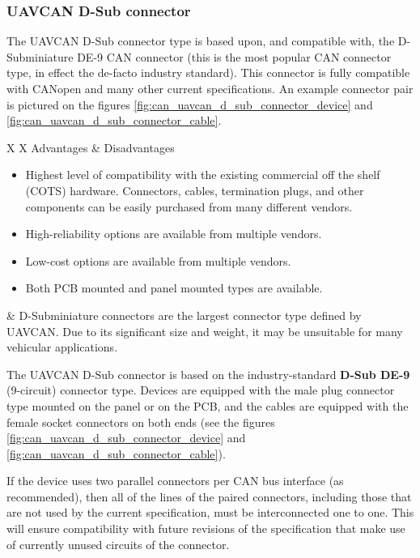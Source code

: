 \subsubsection{UAVCAN D-Sub connector}

The UAVCAN D-Sub connector type is based upon, and compatible with, the D-Subminiature DE-9 CAN connector
(this is the most popular CAN connector type, in effect the de-facto industry standard).
This connector is fully compatible with CANopen and many other current specifications.
An example connector pair is pictured on the figures \ref{fig:can_uavcan_d_sub_connector_device}
and \ref{fig:can_uavcan_d_sub_connector_cable}.

{
\NoLeftSkip
\begin{UAVCANCompactTable}{X X}
    Advantages & Disadvantages \\
    \begin{itemize}
        \item Highest level of compatibility with the existing commercial off the shelf (COTS) hardware.
        Connectors, cables, termination plugs, and other components can be easily purchased from many different vendors.
        \item High-reliability options are available from multiple vendors.
        \item Low-cost options are available from multiple vendors.
        \item Both PCB mounted and panel mounted types are available.
    \end{itemize}
    &
    D-Subminiature connectors are the largest connector type defined by UAVCAN.
    Due to its significant size and weight, it may be unsuitable for many vehicular applications.
\end{UAVCANCompactTable}
}

The UAVCAN D-Sub connector is based on the industry-standard \textbf{D-Sub DE-9} (9-circuit) connector type.
Devices are equipped with the male plug connector type mounted on the panel or on the PCB,
and the cables are equipped with the female socket connectors on both ends
(see the figures \ref{fig:can_uavcan_d_sub_connector_device} and \ref{fig:can_uavcan_d_sub_connector_cable}).

If the device uses two parallel connectors per CAN bus interface (as recommended),
then all of the lines of the paired connectors,
including those that are not used by the current specification,
must be interconnected one to one.
This will ensure compatibility with future revisions of the specification that make use of
currently unused circuits of the connector.

